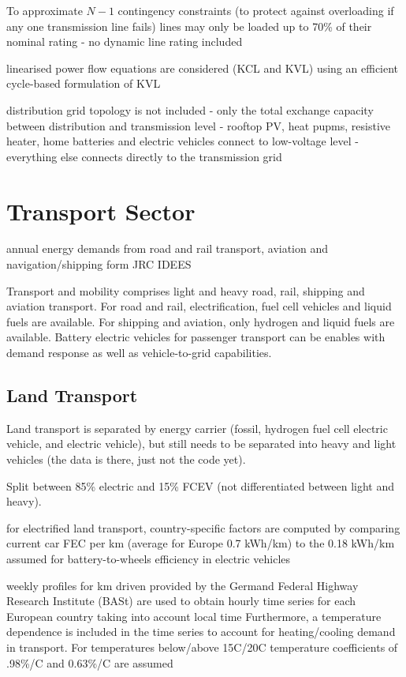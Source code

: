 To approximate $N-1$ contingency constraints (to protect against overloading if any one
transmission line fails) lines may only be loaded up to 70\% of their nominal rating
- no dynamic line rating included

linearised power flow equations are considered (KCL and KVL) using an
efficient cycle-based formulation of KVL

distribution grid topology is not included
- only the total exchange capacity between distribution and transmission level
- rooftop PV, heat pupms, resistive heater, home batteries and electric vehicles connect to low-voltage level
- everything else connects directly to the transmission grid

\section{Transport Sector}

annual energy demands from road and rail transport, aviation and navigation/shipping form JRC IDEES 

Transport and mobility comprises light and heavy road, rail, shipping and
aviation transport. For road and rail, electrification, fuel cell vehicles and
liquid fuels are available. For shipping and aviation, only hydrogen and liquid
fuels are available. Battery electric vehicles for passenger transport can be
enables with demand response as well as vehicle-to-grid capabilities.

\subsection{Land Transport}

Land transport is separated by energy carrier (fossil, hydrogen fuel cell
electric vehicle, and electric vehicle), but still needs to be separated into
heavy and light vehicles (the data is there, just not the code yet).

Split between 85\% electric and 15\% FCEV (not differentiated between light and heavy).

for electrified land transport, country-specific factors are computed by comparing
current car FEC per km (average for Europe 0.7 kWh/km) to the 0.18 kWh/km assumed for
battery-to-wheels efficiency in electric vehicles

weekly profiles for km driven provided by the Germand Federal Highway Research Institute (BASt)
are used to obtain hourly time series for each European country taking into account local time
Furthermore, a temperature dependence is included in the time series to account for heating/cooling
demand in transport. For temperatures below/above 15C/20C temperature coefficients of .98\%/C and 0.63\%/C are assumed \cite{brown2018}

